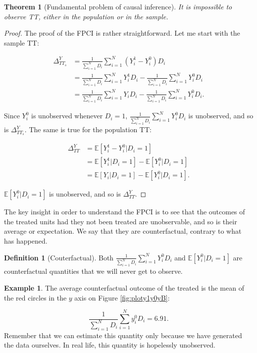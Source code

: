 \documentclass[
]{book}
\newcommand{\esp}[1]{\mathbb{E}[ #1 ]}
\newtheorem{theorem}{Theorem}[chapter]
\theoremstyle{definition}
\newtheorem{definition}{Definition}[chapter]
\theoremstyle{definition}
\newtheorem{example}{Example}[chapter]
\theoremstyle{definition}
\theoremstyle{definition}
\theoremstyle{remark}
\begin{document}
\begin{theorem}[Fundamental problem of causal inference]
\protect\hypertarget{thm:FPCI}{}{\label{thm:FPCI} \iffalse (Fundamental problem of causal inference) \fi{} }It is impossible to observe TT, either in the population or in the sample.
\end{theorem}

\begin{proof}
\iffalse{} {Proof. } \fi{}The proof of the FPCI is rather straightforward.
Let me start with the sample TT:

\begin{align*}
  \Delta^Y_{TT_s} & = \frac{1}{\sum_{i=1}^ND_i}\sum_{i=1}^N(Y_i^1-Y_i^0)D_i \\
                  & = \frac{1}{\sum_{i=1}^ND_i}\sum_{i=1}^NY_i^1D_i- \frac{1}{\sum_{i=1}^ND_i}\sum_{i=1}^NY_i^0D_i \\
                  & = \frac{1}{\sum_{i=1}^ND_i}\sum_{i=1}^NY_iD_i- \frac{1}{\sum_{i=1}^ND_i}\sum_{i=1}^NY_i^0D_i.
\end{align*}

Since \(Y_i^0\) is unobserved whenever \(D_i=1\), \(\frac{1}{\sum_{i=1}^ND_i}\sum_{i=1}^NY_i^0D_i\) is unobserved, and so is \(\Delta^Y_{TT_s}\).
The same is true for the population TT:

\begin{align*}
  \Delta^Y_{TT} & = \esp{Y_i^1-Y_i^0|D_i=1} \\
                & = \esp{Y_i^1|D_i=1}-\esp{Y_i^0|D_i=1}\\
                & = \esp{Y_i|D_i=1}-\esp{Y_i^0|D_i=1}.
\end{align*}

\(\esp{Y_i^0|D_i=1}\) is unobserved, and so is \(\Delta^Y_{TT}\).
\end{proof}

The key insight in order to understand the FPCI is to see that the outcomes of the treated units had they not been treated are unobservable, and so is their average or expectation.
We say that they are counterfactual, contrary to what has happened.

\begin{definition}[Couterfactual]
\protect\hypertarget{def:counter}{}{\label{def:counter} \iffalse (Couterfactual) \fi{} }Both \(\frac{1}{\sum_{i=1}^ND_i}\sum_{i=1}^NY_i^0D_i\) and \(\esp{Y_i^0|D_i=1}\) are counterfactual quantities that we will never get to observe.
\end{definition}

\begin{example}
\protect\hypertarget{exm:unnamed-chunk-11}{}{\label{exm:unnamed-chunk-11} }The average counterfactual outcome of the treated is the mean of the red circles in the \(y\) axis on Figure \ref{fig:ploty1y0yB}:
\end{example}
\[
\frac{1}{\sum_{i=1}^ND_i}\sum_{i=1}^Ny_i^0D_i= 6.91.
\]
Remember that we can estimate this quantity only because we have generated the data ourselves.
In real life, this quantity is hopelessly unobserved.
\end{document}
